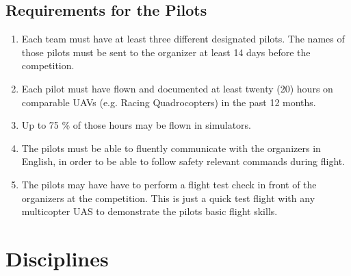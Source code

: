     \subsection{Requirements for the Pilots}\label{pilotrequirements}
    \begin{enumerate}
      \item Each team must have at least three different designated pilots. The names of those pilots must be sent to the organizer at least 
      14 days before the competition. 
      \item Each pilot must have flown and documented at least twenty (20) hours on comparable UAVs (e.g. Racing Quadrocopters) in the past 12 months. 
      \item Up to 75 \% of those hours may be flown in simulators.
      \item The pilots must be able to fluently communicate with the organizers in English, in order to be able to follow safety relevant commands during flight.
      \item The pilots may have have to perform a flight test check in front of the organizers at the competition. This is just a quick test flight with any multicopter UAS to demonstrate the pilots basic flight skills.
    \end{enumerate}




    \section{Disciplines}

